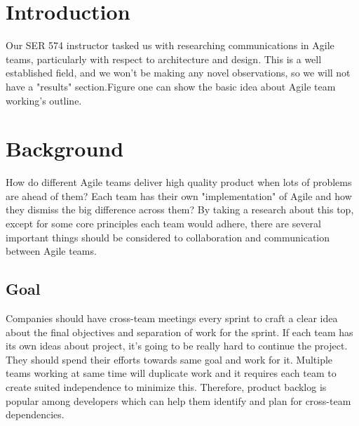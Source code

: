 \documentclass[sigplan,screen]{acmart}
\begin{document}
%

%
\maketitle

\section{Introduction}
Our SER 574 instructor tasked us with researching communications in Agile teams, particularly with respect to architecture and design. This is a well established field, and we won't be making any novel observations, so we will not have a "results" section.Figure one can show the basic idea about Agile team working's outline. 

\section{Background}
How do different Agile teams deliver high quality product when lots of problems are ahead of them? Each team has their own "implementation" of Agile and how they dismiss the big difference across them? By taking a research about this top, except for some core principles each team would adhere, there are several important things should be considered to collaboration and communication between Agile teams.

\subsection{Goal}
Companies should have cross-team meetings every sprint to craft a clear idea about the final objectives and separation of work for the sprint. If each team has its own ideas about project, it's going to be really hard to continue the project. They should spend their efforts towards same goal and work for it. Multiple teams working at same time will duplicate work and it requires each team to create suited independence to minimize this. Therefore, product backlog is popular among developers which can help them identify and plan for cross-team dependencies.
\end{document}
